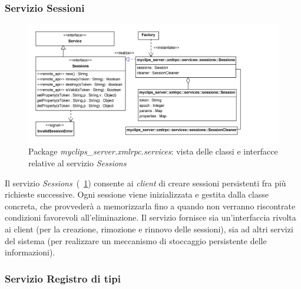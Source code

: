 \subsubsection{Servizio Sessioni}

\begin{figure}
\centering
\includegraphics[width=1\textwidth]{Immagini/Capitolo3/Classi/myclips_server_services_Sessions.png}
\caption{Package \emph{myclips\_server.xmlrpc.services}: vista delle classi e interfacce relative al servizio \emph{Sessions}}\label{fig:class-myclips-server-services-sessions}
\end{figure}

Il servizio \emph{Sessions}~(\figurename~\ref{fig:class-myclips-server-services-sessions}) consente ai \emph{client} di creare sessioni persistenti fra più richieste successive. Ogni sessione viene inizializzata e gestita dalla classe concreta, che provvederà a memorizzarla fino a quando non verranno riscontrate condizioni favorevoli all'eliminazione.
Il servizio fornisce sia un'interfaccia rivolta ai client (per la creazione, rimozione e rinnovo delle sessioni), sia ad altri servizi del sistema (per realizzare un meccanismo di stoccaggio persistente delle informazioni).


\subsubsection{Servizio Registro di tipi}

